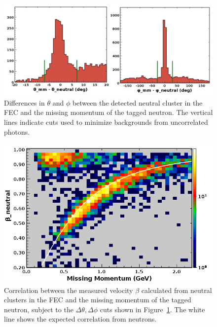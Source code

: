 \begin{figure}[h]
\centering
\includegraphics[width=1.0\columnwidth,keepaspectratio]{img/S10_4_1.png}
\caption[]{Differences in $\theta$ and $\phi$ between the detected neutral cluster in the FEC and the missing momentum of the tagged neutron.  The vertical lines indicate cuts used to minimize backgrounds from uncorrelated photons.}
\label{fig:S10_4_1}
\end{figure}

\begin{figure}[h]
\centering
\includegraphics[width=1.0\columnwidth,keepaspectratio]{img/S10_4_2.png}
\caption[]{Correlation between the measured velocity $\beta$ calculated from neutral clusters in the FEC and the missing momentum of the tagged neutron, subject to the $\Delta\theta,\Delta\phi$ cuts shown in Figure~\ref{fig:S10_4_1}.  The white line shows the expected correlation from neutrons.}
\label{fig:S10_4_2}
\end{figure}

